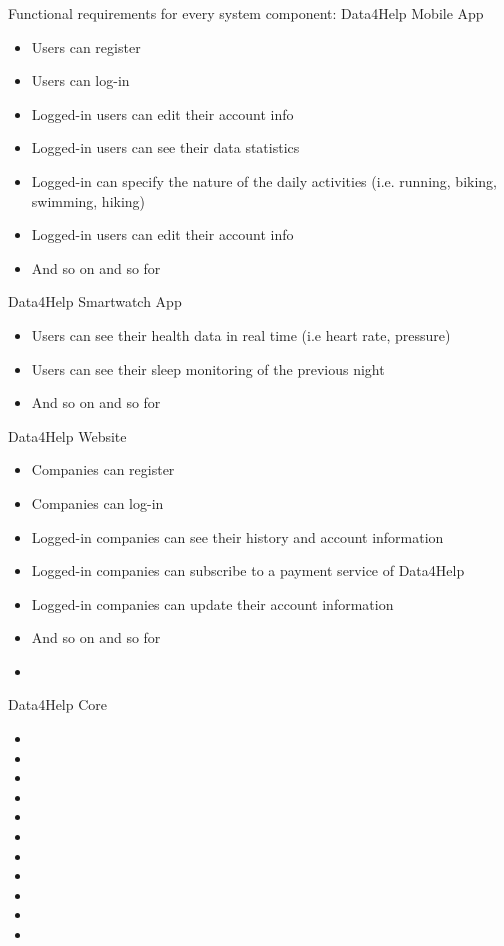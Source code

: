Functional requirements for every system component:
\newline
Data4Help Mobile App
\begin{itemize}
    \item Users can register
    \item Users can log-in
    \item Logged-in users can edit their account info
    \item Logged-in users can see their data statistics
    \item Logged-in can specify the nature of the daily activities (i.e. running, biking, swimming, hiking)
    \item Logged-in users can edit their account info
    \item And so on and so for
\end{itemize}

Data4Help Smartwatch App
\begin{itemize}
    \item Users can see their health data in real time (i.e heart rate, pressure)
    \item Users can see their sleep monitoring of the previous night
    \item And so on and so for
\end{itemize}
\newline
Data4Help Website
\begin{itemize}
    \item Companies can register
    \item Companies can log-in
    \item Logged-in companies can see their history and account information
    \item Logged-in companies can subscribe to a payment service of Data4Help
    \item Logged-in companies can update their account information
    \item And so on and so for
    \item 
\end{itemize}
\newline
Data4Help Core
\begin{itemize}
    \item 
    \item 
    \item 
    \item
    \item 
    \item 
    \item 
    \item 
    \item 
    \item 
    \item 
\end{itemize}
\newline